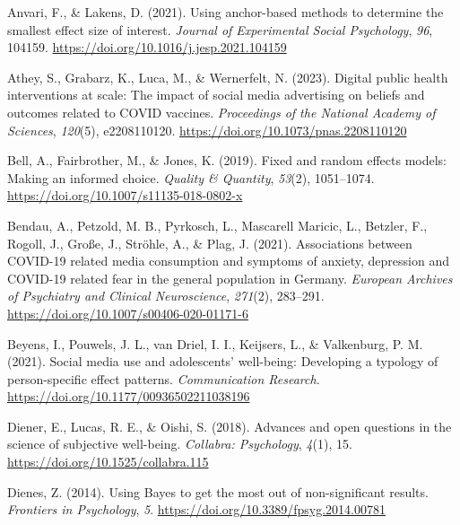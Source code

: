 \documentclass[
  man,mask,floatsintext]{apa7}
\newlength{\cslhangindent}
\newlength{\cslentryspacingunit} %
\newenvironment{CSLReferences}[2] %
 {%
  \setlength{\parindent}{0pt}
  \ifodd #1
  \let\oldpar\par
  \def\par{\hangindent=\cslhangindent\oldpar}
  \fi
  \setlength{\parskip}{#2\cslentryspacingunit}
 }%
 {}
\begin{document}
\hypertarget{refs}{}
\begin{CSLReferences}{1}{0}
\leavevmode{}%
Anvari, F., \& Lakens, D. (2021). Using anchor-based methods to determine the smallest effect size of interest. \emph{Journal of Experimental Social Psychology}, \emph{96}, 104159. \url{https://doi.org/10.1016/j.jesp.2021.104159}

\leavevmode{}%
Athey, S., Grabarz, K., Luca, M., \& Wernerfelt, N. (2023). Digital public health interventions at scale: {The} impact of social media advertising on beliefs and outcomes related to {COVID} vaccines. \emph{Proceedings of the National Academy of Sciences}, \emph{120}(5), e2208110120. \url{https://doi.org/10.1073/pnas.2208110120}

\leavevmode{}%
Bell, A., Fairbrother, M., \& Jones, K. (2019). Fixed and random effects models: Making an informed choice. \emph{Quality \& Quantity}, \emph{53}(2), 1051--1074. \url{https://doi.org/10.1007/s11135-018-0802-x}

\leavevmode{}%
Bendau, A., Petzold, M. B., Pyrkosch, L., Mascarell Maricic, L., Betzler, F., Rogoll, J., Große, J., Ströhle, A., \& Plag, J. (2021). Associations between {COVID-19} related media consumption and symptoms of anxiety, depression and {COVID-19} related fear in the general population in {Germany}. \emph{European Archives of Psychiatry and Clinical Neuroscience}, \emph{271}(2), 283--291. \url{https://doi.org/10.1007/s00406-020-01171-6}

\leavevmode{}%
Beyens, I., Pouwels, J. L., van Driel, I. I., Keijsers, L., \& Valkenburg, P. M. (2021). Social media use and adolescents' well-being: {Developing} a typology of person-specific effect patterns. \emph{Communication Research}. \url{https://doi.org/10.1177/00936502211038196}

\leavevmode{}%
Diener, E., Lucas, R. E., \& Oishi, S. (2018). Advances and open questions in the science of subjective well-being. \emph{Collabra: Psychology}, \emph{4}(1), 15. \url{https://doi.org/10.1525/collabra.115}

\leavevmode{}%
Dienes, Z. (2014). Using {Bayes} to get the most out of non-significant results. \emph{Frontiers in Psychology}, \emph{5}. \url{https://doi.org/10.3389/fpsyg.2014.00781}


\end{CSLReferences}
\end{document}
